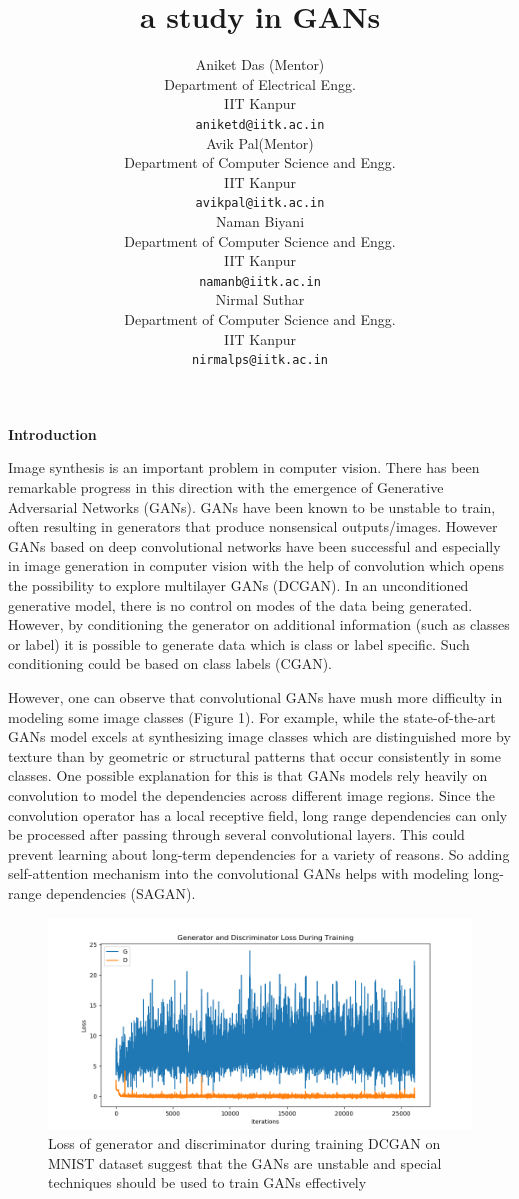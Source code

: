 \documentclass{article}
\title{a study in GANs}
\author{
   Aniket Das (Mentor)\\
   Department of Electrical Engg.\\
   IIT Kanpur\\
   \texttt{aniketd@iitk.ac.in} \\
   \And
    Avik Pal(Mentor)\\
     Department of Computer Science and Engg.\\
     IIT Kanpur\\
     \texttt{avikpal@iitk.ac.in}\\
     \And
     Naman Biyani\\
     Department of Computer Science and Engg.\\
     IIT Kanpur\\
     \texttt{namanb@iitk.ac.in} \\
     \And
     Nirmal Suthar\\
     Department of Computer Science and Engg.\\
     IIT Kanpur\\
     \texttt{nirmalps@iitk.ac.in} \\
     }
\begin{document}
\maketitle
\begin{center}
    {\Large{\textbf{Introduction}}}
\end{center}

Image synthesis is an important problem in computer vision. There has been remarkable progress in this direction with the emergence of Generative Adversarial Networks (GANs). GANs have
been known to be unstable to train, often resulting in generators that produce nonsensical outputs/images.
However GANs based on deep convolutional networks have been successful and especially in image generation in computer vision with the help of convolution which opens the possibility to explore multilayer GANs (DCGAN). In an unconditioned generative model, there is no control on modes of the data being generated.
However, by conditioning the generator on additional information (such as classes or label) it is possible to generate data which is class or label specific. Such conditioning could be based on class labels (CGAN).

However, one can observe that convolutional GANs have mush more difficulty in modeling some image classes (Figure 1). For example, while the state-of-the-art GANs model excels at synthesizing image classes which are distinguished more by texture than by geometric or structural patterns that occur consistently in some classes. One possible explanation for this is that GANs models rely heavily on convolution to model the  dependencies across different image regions. Since the convolution operator has a local receptive field, long range dependencies can only be processed after passing through several convolutional layers. This could prevent learning about long-term dependencies for a variety of reasons. So adding self-attention mechanism into the convolutional GANs helps with modeling long-range dependencies (SAGAN).

\begin{figure}[h]
    \centering
    \includegraphics[width=.8\textwidth]{images/intro_progress.png}
    \caption{Loss of generator and discriminator during training DCGAN on MNIST dataset suggest that the GANs are unstable and special techniques should be used to train GANs effectively}
    \label{fig:mesh1}
\end{figure}
\medskip
\end{document}
